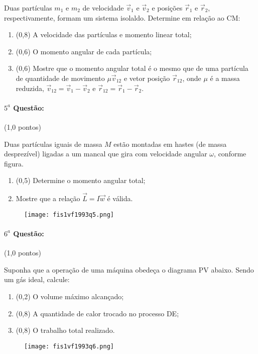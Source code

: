 \documentclass[12pt,a4paper]{article}
\begin{document}
Duas partículas $m_1$ e $m_2$ de velocidade $\overrightarrow{v}_1$ e $\overrightarrow{v}_2$ e posições $\overrightarrow{r}_1$ e
$\overrightarrow{r}_2$, respectivamente, formam um sistema isolaldo. Determine em relação ao CM:

\begin{enumerate}[label=\alph*)]
\item (0,8) A velocidade das partículas e momento linear total;
\item (0,6) O momento angular de cada partícula;
\item (0,6) Mostre que o momento angular total é o mesmo que de uma partícula de quantidade de movimento $\mu \overrightarrow{v}_{12}$ e vetor posição
$\overrightarrow{r}_{12}$, onde $\mu$ é a massa reduzida, $\overrightarrow{v}_{12}=\overrightarrow{v}_1-\overrightarrow{v}_2$ e $\overrightarrow{r}_{12}=\overrightarrow{r}_1-\overrightarrow{r}_2$.
\end{enumerate}

\paragraph{$5^a$ Questão:} (1,0 pontos)

Duas partículas iguais de massa $M$ estão montadas em hastes (de massa desprezível) ligadas a um mancal que gira com velocidade angular $\omega$, conforme figura.

\begin{enumerate}[label=\alph*)]
\item (0,5) Determine o momento angular total;
\item Mostre que a relação $\overrightarrow{L}=I\overrightarrow{w}$ é válida.
\end{enumerate}
\begin{figure}[ht]
\centering
\texttt{[image: fis1vf1993q5.png]}
\end{figure}
\paragraph{$6^a$ Questão:} (1,0 pontos)

Suponha que a operação de uma máquina obedeça o diagrama PV abaixo. Sendo um gás ideal, calcule:

\begin{enumerate}[label=\alph*)]
\item (0,2) O volume máximo alcançado;
\item (0,8) A quantidade de calor trocado no processo DE;
\item (0,8) O trabalho total realizado.
\end{enumerate}
\begin{figure}[ht]
\centering
\texttt{[image: fis1vf1993q6.png]}
\end{figure}
\newpage
\end{document}
